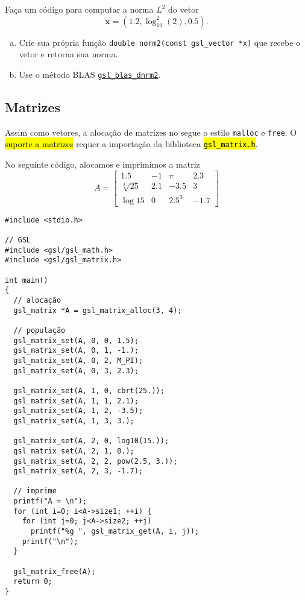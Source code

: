 \documentclass[12pt]{article}
\begin{document}
\begin{exr}
  Faça um código para computar a norma $L^2$ do vetor
  \begin{equation}
    \pmb{x} = (1.2, \log_{10}^2(2), 0.5).
  \end{equation}
  \begin{enumerate}[a)]
  \item Crie sua própria função \lstinline+double norm2(const gsl_vector *x)+ que recebe o vetor e retorna sua norma.
  \item Use o método BLAS \href{https://www.gnu.org/software/gsl/doc/html/blas.html\#c.gsl_blas_dnrm2}{\lstinline+gsl_blas_dnrm2+}.
  \end{enumerate}
\end{exr}

\subsection{Matrizes}\label{sec_mat_subsec_mat}

Assim como vetores, a alocação de matrizes no {\gsl} segue o estilo \lstinline!malloc! e \lstinline!free!. O \hl{suporte a matrizes} requer a importação da biblioteca \hl{{\lstinline+gsl_matrix.h+}}.

\begin{ex}
  No seguinte código, alocamos e imprimimos a matriz
  \begin{equation}
    A =
    \begin{bmatrix}
      1.5 & -1 & \pi & 2.3\\
      \sqrt[3]{25} & 2.1 & -3.5 & 3\\
      \log 15 & 0 & 2.5^3 & -1.7
    \end{bmatrix}
  \end{equation}

\begin{lstlisting}[caption=matriz.cc]
#include <stdio.h>

// GSL
#include <gsl/gsl_math.h>
#include <gsl/gsl_matrix.h>

int main()
{
  // alocação
  gsl_matrix *A = gsl_matrix_alloc(3, 4);

  // população
  gsl_matrix_set(A, 0, 0, 1.5);
  gsl_matrix_set(A, 0, 1, -1.);
  gsl_matrix_set(A, 0, 2, M_PI);
  gsl_matrix_set(A, 0, 3, 2.3);

  gsl_matrix_set(A, 1, 0, cbrt(25.));
  gsl_matrix_set(A, 1, 1, 2.1);
  gsl_matrix_set(A, 1, 2, -3.5);
  gsl_matrix_set(A, 1, 3, 3.);

  gsl_matrix_set(A, 2, 0, log10(15.));
  gsl_matrix_set(A, 2, 1, 0.);
  gsl_matrix_set(A, 2, 2, pow(2.5, 3.));
  gsl_matrix_set(A, 2, 3, -1.7);

  // imprime
  printf("A = \n");
  for (int i=0; i<A->size1; ++i) {
    for (int j=0; j<A->size2; ++j)
      printf("%g ", gsl_matrix_get(A, i, j));
    printf("\n");
  }

  gsl_matrix_free(A);
  return 0;
}
\end{lstlisting}
\end{ex}
\end{document}
